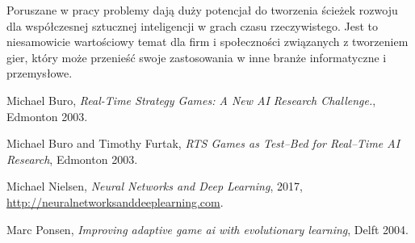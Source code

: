 \documentclass[12pt]{report}
\begin{document}
Poruszane w pracy problemy dają duży potencjał do tworzenia ścieżek rozwoju dla współczesnej sztucznej inteligencji w grach czasu rzeczywistego. Jest to niesamowicie wartościowy temat dla firm i społeczności związanych z tworzeniem gier, który może przenieść swoje zastosowania w inne branże informatyczne i przemysłowe.




\cleardoublepage
{}
\begin{thebibliography}{9}

 Michael Buro, \emph{Real-Time Strategy Games: A New AI Research Challenge.}, Edmonton 2003.

 Michael Buro and Timothy Furtak, \emph{RTS Games as Test–Bed for Real–Time AI Research}, Edmonton 2003.

 Michael Nielsen, \emph{Neural Networks and Deep Learning}, 2017, \href{http://neuralnetworksanddeeplearning.com}{http://neuralnetworksanddeeplearning.com}.

 Marc Ponsen, \emph{Improving adaptive game ai with evolutionary learning}, Delft 2004.



\end{thebibliography}
\end{document}
